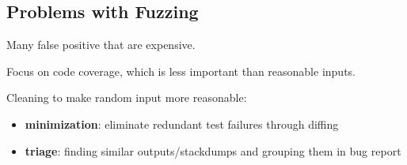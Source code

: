 \documentclass[11pt]{article}
\begin{document}
\subsection{Problems with Fuzzing}
\label{sec:org91a0305}
Many false positive that are expensive.

Focus on code coverage, which is less important than reasonable inputs.

Cleaning to make random input more reasonable:
\begin{itemize}
\item \textbf{minimization}: eliminate redundant test failures through diffing
\item \textbf{triage}: finding similar outputs/stackdumps and grouping them in bug report
\end{itemize}
\end{document}
